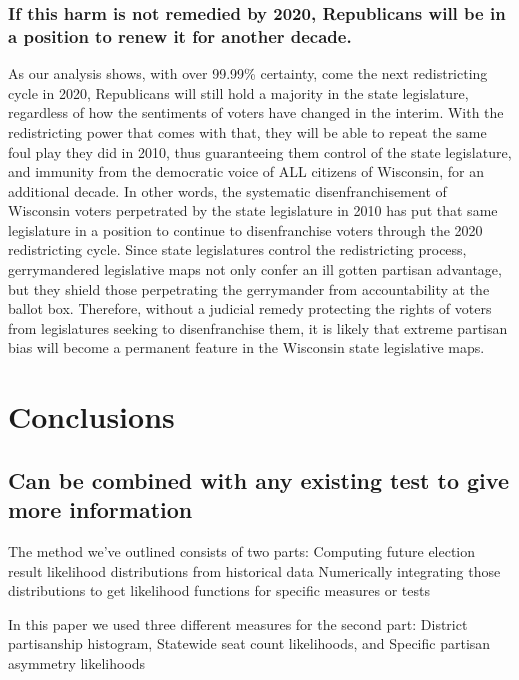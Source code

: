 \documentclass[preprint,12pt]{article}
\begin{document}
\subsubsection{If this harm is not remedied by 2020, Republicans will be in a position to renew it for another decade.}
 
As our analysis shows, with over 99.99\% certainty, come the next redistricting cycle in 2020, Republicans will still hold a majority in the state legislature, regardless of how the sentiments of voters have changed in the interim.  With the redistricting power that comes with that, they will be able to repeat the same foul play they did in 2010, thus guaranteeing them control of the state legislature, and immunity from the democratic voice of ALL citizens of Wisconsin, for an additional decade. In other words, the systematic disenfranchisement of Wisconsin voters perpetrated by the state legislature in 2010 has put that same legislature in a position to continue to disenfranchise voters through the 2020 redistricting cycle. Since state legislatures control the redistricting process, gerrymandered legislative maps not only confer an ill gotten partisan advantage, but they shield those perpetrating the gerrymander from accountability at the ballot box. Therefore, without a judicial remedy protecting the rights of voters from legislatures seeking to disenfranchise them, it is likely that extreme partisan bias will become a permanent feature in the Wisconsin state legislative maps.



\section{Conclusions}

\subsection{Can be combined with any existing test to give more information}
 
The method we've outlined consists of two parts: 
Computing future election result likelihood distributions from historical data
Numerically integrating those distributions to get likelihood functions for specific measures or tests
 
In this paper we used three different measures for the second part:
District partisanship histogram,
Statewide seat count likelihoods, and 
Specific partisan asymmetry likelihoods
 
\end{document}
